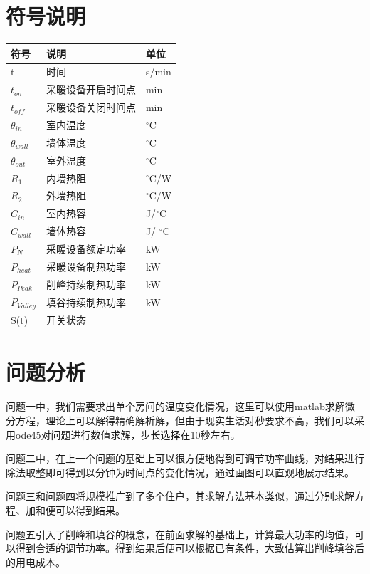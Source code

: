 \documentclass[withoutpreface,bwprint]{cumcmthesis} %
\begin{document}
\section{符号说明}
\begin{center}
    \begin{tabular}{p{5cm}p{5cm}p{5cm}}
    \toprule
       符号  &  说明 &单位 \\
    \hline
        t & 时间 & s/min\\
        $t_{on}$ & 采暖设备开启时间点 & min\\
        $t_{off}$ & 采暖设备关闭时间点 & min\\
        $\theta_{in}$ & 室内温度& $^\circ$C\\ 
        $\theta_{wall}$ & 墙体温度& $^\circ$C\\
        $\theta_{out}$ & 室外温度& $^\circ$C\\
        $R_1$ & 内墙热阻 &$^\circ$C/W \\
        $R_2$ & 外墙热阻 &$^\circ$C/W\\
        $C_{in}$ & 室内热容 & J/$^\circ$C \\
        $C_{wall}$ & 墙体热容 & J/ $^\circ$C \\
        $P_N$ &采暖设备额定功率 & kW\\
        $P_{heat}$ &采暖设备制热功率 & kW\\
         $P_{Peak}$ &削峰持续制热功率 & kW\\
          $P_{Valley}$ &填谷持续制热功率 & kW\\
        S(t) & 开关状态& \\
        
    \bottomrule
    \end{tabular}
\end{center}
\section{问题分析}
问题一中，我们需要求出单个房间的温度变化情况，这里可以使用matlab求解微分方程，理论上可以解得精确解析解，但由于现实生活对秒要求不高，我们可以采用ode45对问题进行数值求解，步长选择在10秒左右。

问题二中，在上一个问题的基础上可以很方便地得到可调节功率曲线，对结果进行除法取整即可得到以分钟为时间点的变化情况，通过画图可以直观地展示结果。

问题三和问题四将规模推广到了多个住户，其求解方法基本类似，通过分别求解方程、加和便可以得到结果。

问题五引入了削峰和填谷的概念，在前面求解的基础上，计算最大功率的均值，可以得到合适的调节功率。得到结果后便可以根据已有条件，大致估算出削峰填谷后的用电成本。
\end{document}
